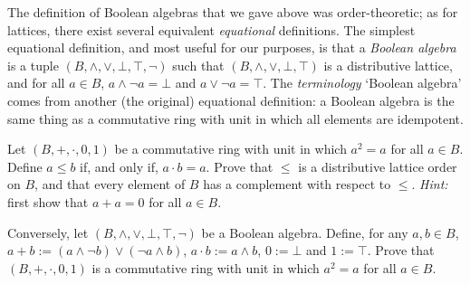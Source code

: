 The definition of Boolean algebras that we gave above was order-theoretic; as for lattices, there exist several equivalent \emph{equational} definitions. The simplest equational definition, and most useful for our purposes, is that a \emph{Boolean algebra} is a tuple $(B,\wedge,\vee,\bot,\top,\neg)$ such that $(B,\wedge,\vee,\bot,\top)$ is a distributive lattice, and for all $a \in B$, $a \wedge \neg a = \bot$ and $a \vee \neg a = \top$. The \emph{terminology} `Boolean algebra' comes from another (the original) equational definition: a Boolean algebra is the same thing as a commutative ring with unit in which all elements are idempotent.
\begin{exercise}\label{exe:BAeq}\easy
Let $(B,+,\cdot,0,1)$ be a commutative ring with unit in which $a^2 = a$ for all $a \in B$. Define $a \leq b$ if, and only if, $a \cdot b = a$. Prove that $\leq$ is a distributive lattice order on $B$, and that
 every element of $B$ has a complement with respect to $\leq$. \emph{Hint:} first show that $a + a = 0$ for all $a \in B$.

Conversely, let $(B,\wedge,\vee,\bot,\top,\neg)$ be a Boolean algebra. Define, for any $a, b \in B$, $a + b := (a \wedge \neg b) \vee (\neg a \wedge b)$, $a \cdot b := a \wedge b$, $0 := \bot$ and $1 := \top$. Prove that $(B,+,\cdot,0,1)$ is a commutative ring with unit in which $a^2 = a$ for all $a \in B$.
\end{exercise}

